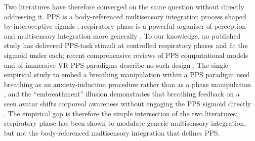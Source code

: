 Two literatures have therefore converged on the same question without directly addressing it. PPS is a body-referenced multisensory integration process shaped by interoceptive signals \citep{Ardizzi2018, salvato_2020, bogdanova_2021}; respiratory phase is a powerful organiser of perception and multisensory integration more generally \citep{saltafossi_2025, kluger_2021, grund_2021}. To our knowledge, no published study has delivered PPS-task stimuli at controlled respiratory phases and fit the sigmoid under each; recent comprehensive reviews of PPS computational models and of immersive-VR PPS paradigms describe no such design \citep{bertoni_2025, karakoc_2025}. The single empirical study to embed a breathing manipulation within a PPS paradigm used breathing as an anxiety-induction procedure rather than as a phase manipulation \citep{spaccasassi_2019}, and the ``embreathment'' illusion demonstrates that breathing feedback on a seen avatar shifts corporeal awareness without engaging the PPS sigmoid directly \citep{monti2020embreathment, Allard2017, Betka2020, Betka2022}. The empirical gap is therefore the simple intersection of the two literatures: respiratory phase has been shown to modulate generic multisensory integration, but not the body-referenced multisensory integration that defines PPS.

